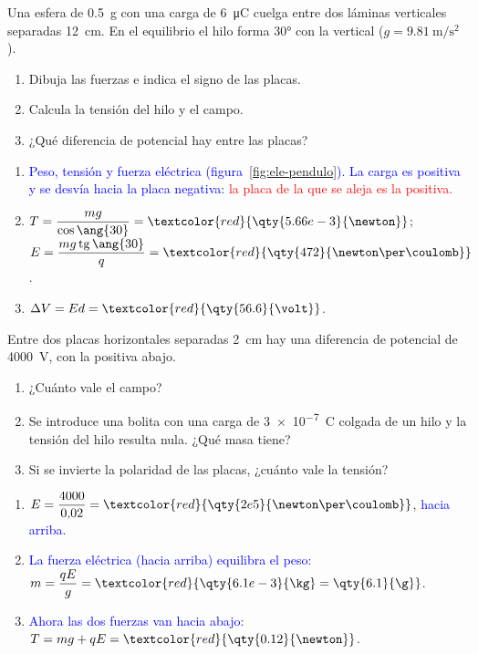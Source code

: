 \begin{exercise}
    Una esfera de \qty{0.5}{\g} con una carga de \qty{6}{\micro\coulomb} cuelga entre dos láminas verticales separadas \qty{12}{\cm}.
    En el equilibrio el hilo forma \ang{30} con la vertical (\(g = \qty{9.81}{\m\per\second\squared}\)).
    \begin{enumerate}[label=\letraminuscula]
        \item Dibuja las fuerzas e indica el signo de las placas.
        \item Calcula la tensión del hilo y el campo.
        \item ¿Qué diferencia de potencial hay entre las placas?
    \end{enumerate}
    \begin{solu}
        \begin{enumerate}[label=\letraminuscula]
            \item \textcolor{blue}{Peso, tensión y fuerza eléctrica (figura~\ref{fig:ele-pendulo}). La carga es positiva y se desvía hacia la placa
            negativa}: \textcolor{red}{la placa de la que se aleja es la positiva.}
            \item \(T = \dfrac{mg}{\cos\ang{30}} = \textcolor{red}{\qty{5.66e-3}{\newton}}\); \(E = \dfrac{mg\tg\ang{30}}{q} = \textcolor{red}{\qty{472}{\newton\per\coulomb}}\).
            \item \(\Delta V = E d = \textcolor{red}{\qty{56.6}{\volt}}\).
        \end{enumerate}
    \end{solu}
\end{exercise}

\begin{exercise}
    Entre dos placas horizontales separadas \qty{2}{\cm} hay una diferencia de potencial de \qty{4000}{\volt}, con la positiva abajo.
    \begin{enumerate}[label=\letraminuscula]
        \item ¿Cuánto vale el campo?
        \item Se introduce una bolita con una carga de \qty{3e-7}{\coulomb} colgada de un hilo y la tensión del hilo resulta nula. ¿Qué masa tiene?
        \item Si se invierte la polaridad de las placas, ¿cuánto vale la tensión?
    \end{enumerate}
    \begin{solu}
        \begin{enumerate}[label=\letraminuscula]
            \item \(E = \dfrac{4000}{0{,}02} = \textcolor{red}{\qty{2e5}{\newton\per\coulomb}}\), \textcolor{blue}{hacia arriba.}
            \item \textcolor{blue}{La fuerza eléctrica (hacia arriba) equilibra el peso:} \(m = \dfrac{qE}{g} = \textcolor{red}{\qty{6.1e-3}{\kg} = \qty{6.1}{\g}}\).
            \item \textcolor{blue}{Ahora las dos fuerzas van hacia abajo:} \(T = mg + qE = \textcolor{red}{\qty{0.12}{\newton}}\).
        \end{enumerate}
    \end{solu}
\end{exercise}

